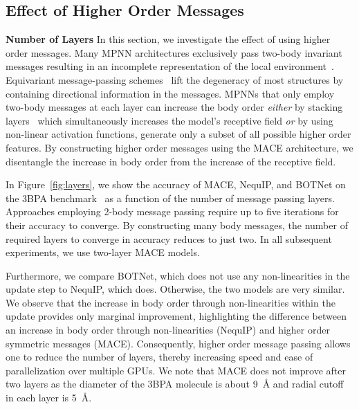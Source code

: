 \documentclass{article}
\newcommand*\compactparagraph[1]{\textbf{#1} \quad}
\begin{document}
\subsection{Effect of Higher Order Messages}

\compactparagraph{Number of Layers}
In this section, we investigate the effect of using higher order messages.
Many MPNN architectures \cite{schnet,unke2019physnet} exclusively pass two-body invariant messages resulting in an incomplete representation of the local environment~\cite{pozdnyakov2022incompleteness}.
Equivariant message-passing schemes~\cite{nequip,Schutt2021PaiNN,Brandstetter2021Geometric} lift the degeneracy of most structures by containing directional information in the messages.
MPNNs that only employ two-body messages at each layer can increase the body order \emph{either} by stacking layers~\cite{kondor2018N_bodyNets} which simultaneously increases the model's receptive field \emph{or} by using non-linear activation functions, generate only a subset of all possible higher order features.
By constructing higher order messages using the MACE architecture, we disentangle the increase in body order from the increase of the receptive field.

In Figure~\ref{fig:layers}, we show the accuracy of MACE, NequIP, and BOTNet \cite{botnet} on the 3BPA benchmark~\cite{kovacs2021} as a function of the number of message passing layers.
Approaches employing 2-body message passing require up to five iterations for their accuracy to converge.
By constructing many body messages, the number of required layers to converge in accuracy reduces to just two. In all subsequent experiments, we use two-layer MACE models.

Furthermore, we compare BOTNet, which does not use any non-linearities in the update step to NequIP, which does.
Otherwise, the two models are very similar.
We observe that the increase in body order through non-linearities within the update provides only marginal improvement, highlighting the difference between an increase in body order through non-linearities (NequIP) and higher order symmetric messages (MACE).
Consequently, higher order message passing allows one to reduce the number of layers, thereby increasing speed and ease of parallelization over multiple GPUs.
We note that MACE does not improve after two layers as the diameter of the 3BPA molecule is about 9~\AA{} and radial cutoff in each layer is 5~\AA.
\end{document}
